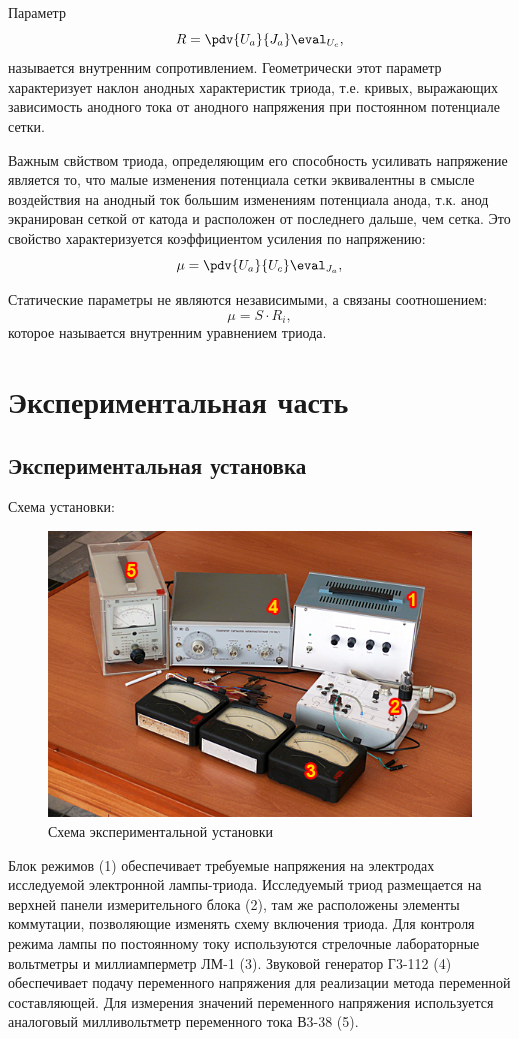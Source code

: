 Параметр 
\begin{equation}
	R= \pdv{U_a}{J_a} \eval _{U_c}, 
\end{equation}
называется внутренним сопротивлением. Геометрически этот параметр характеризует наклон анодных характеристик триода,
т.е. кривых, выражающих зависимость анодного тока от анодного напряжения при постоянном потенциале  
сетки.

Важным свйством триода, определяющим его способность усиливать напряжение является то, что малые 
изменения потенциала сетки эквивалентны в смысле воздействия на анодный ток большим изменениям 
потенциала анода, т.к. анод экранирован сеткой от катода и расположен от последнего дальше, 
чем сетка. Это свойство характеризуется коэффициентом усиления по напряжению:
\begin{equation}
	\mu= \pdv{U_a}{U_c} \eval _{J_a}, 
\end{equation}

Статические параметры не являются независимыми, а связаны соотношением:
\begin{equation}
	\mu= S \cdot R_i, 
\end{equation}
которое называется внутренним уравнением триода.

\section{Экспериментальная часть}
\subsection{Экспериментальная установка}
Схема установки:
\begin{figure}[h!]
	\centering
	\includegraphics[width=0.5\linewidth]{fig/img4.jpg}
	\caption{Схема экспериментальной установки}
	\label{fig:10}
\end{figure}

Блок режимов (1) обеспечивает требуемые напряжения на электродах исследуемой электронной 
лампы-триода. Исследуемый триод размещается на верхней панели измерительного блока (2), 
там же расположены элементы коммутации, позволяющие изменять схему включения триода. Для 
контроля режима лампы по постоянному току используются стрелочные лабораторные вольтметры 
и миллиамперметр ЛМ-1 (3). Звуковой генератор Г3-112 (4) обеспечивает подачу переменного 
напряжения для реализации метода переменной составляющей. Для измерения значений переменного 
напряжения используется аналоговый милливольтметр переменного тока В3-38 (5).

